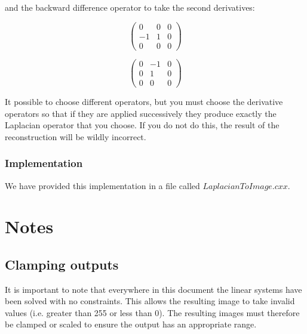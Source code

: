 \documentclass{InsightArticle}
\begin{document}
and the backward difference operator to take the second derivatives:

\begin{figure}[H]
  \begin{minipage}[b]{0.5\linewidth}
    \centering

    \begin{equation}
    \begin{pmatrix}
    0 & 0 & 0 \\
    -1 & 1 & 0\\
    0 & 0 & 0
    \end{pmatrix}
    \end{equation}

  \end{minipage}
    \hspace{0.5cm}
  \begin{minipage}[b]{0.5\linewidth}

    \begin{equation}
    \begin{pmatrix}
    0 & -1 & 0 \\
    0 & 1 & 0\\
    0 & 0 & 0
    \end{pmatrix}
    \end{equation}

  \end{minipage}
\end{figure}

It possible to choose different operators, but you must choose the derivative operators so that if they are applied successively they produce exactly the Laplacian operator that you choose. If you do not do this, the result of the reconstruction will be wildly incorrect.

\subsubsection{Implementation}
We have provided this implementation in a file called $LaplacianToImage.cxx$.

\section{Notes}
\subsection{Clamping outputs}
It is important to note that everywhere in this document the linear systems have been solved with no constraints. This allows the resulting image to take invalid values (i.e. greater than 255 or less than 0). The resulting images must therefore be clamped or scaled to ensure the output has an appropriate range.
\end{document}
